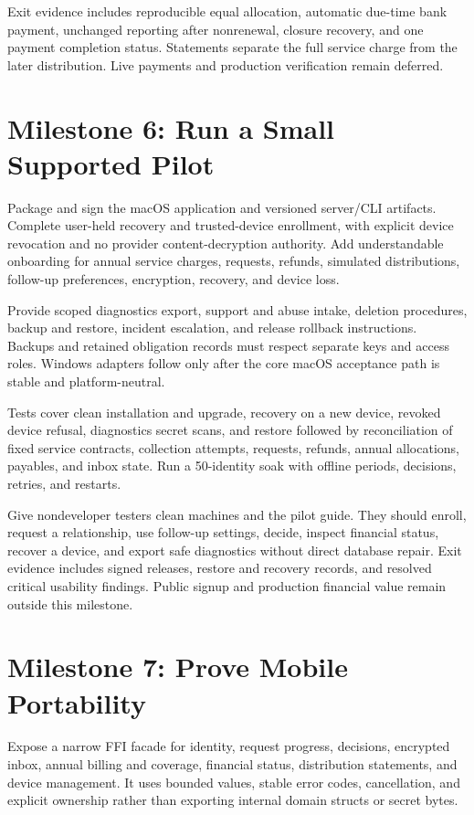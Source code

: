 \documentclass[11pt]{article}
\begin{document}
Exit evidence includes reproducible equal allocation, automatic due-time bank
payment, unchanged reporting after nonrenewal, closure recovery, and one payment
completion status. Statements separate the full service charge from the later
distribution. Live payments and production verification remain deferred.

\section{Milestone 6: Run a Small Supported Pilot}

Package and sign the macOS application and versioned server/CLI artifacts.
Complete user-held recovery and trusted-device enrollment, with explicit device
revocation and no provider content-decryption authority. Add understandable
onboarding for annual service charges, requests, refunds, simulated distributions,
follow-up preferences,
encryption, recovery, and device loss.

Provide scoped diagnostics export, support and abuse intake, deletion procedures,
backup and restore, incident escalation, and release rollback instructions.
Backups and retained obligation records must respect separate keys and access
roles. Windows adapters follow only after the core macOS acceptance path is
stable and platform-neutral.

Tests cover clean installation and upgrade, recovery on a new device, revoked
device refusal, diagnostics secret scans, and restore followed by reconciliation
of fixed service contracts, collection attempts, requests, refunds, annual allocations,
payables, and inbox state. Run a
50-identity soak with offline periods, decisions, retries, and restarts.

Give nondeveloper testers clean machines and the pilot guide. They should enroll,
request a relationship, use follow-up settings, decide, inspect financial status,
recover a device, and export safe diagnostics without direct database repair.
Exit evidence includes signed releases, restore and recovery records, and resolved
critical usability findings. Public signup and production financial value remain
outside this milestone.

\section{Milestone 7: Prove Mobile Portability}

Expose a narrow FFI facade for identity, request progress, decisions, encrypted
inbox, annual billing and coverage, financial status, distribution statements, and device management. It uses
bounded values, stable error codes, cancellation, and explicit ownership rather
than exporting internal domain structs or secret bytes.
\end{document}
